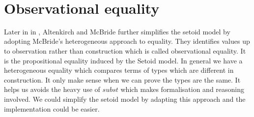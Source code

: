 \begin{code}
\\
\>[0]\<[2]%
\>[2] \AgdaSymbol{=}  \<[15]%
\>[15]\<%
\\
\>[2]\<[4]%
\>[4]\AgdaSymbol{\{}  \AgdaSymbol{=} \<%
\\
\>[2]\<[4]%
\>[4]\AgdaSymbol{;}  \AgdaSymbol{=} \AgdaFunction{[}  \AgdaFunction{]subst}\<%
\\
\>[2]\<[4]%
\>[4]\AgdaSymbol{;}  \AgdaSymbol{=}  \AgdaSymbol{\{}\AgdaSymbol{\}} \AgdaSymbol{\{}\AgdaSymbol{\}}  \AgdaSymbol{\{}\AgdaSymbol{\}} \AgdaSymbol{\{}\AgdaSymbol{\}}       \<%
\\
\>[2]\<[4]%
\>[4]\AgdaSymbol{;}  \AgdaSymbol{=}           \AgdaSymbol{\_} \AgdaSymbol{\_} \AgdaSymbol{(}\AgdaFunction{[}  \AgdaFunction{]refl*} \AgdaSymbol{\_} \AgdaSymbol{\_)}\<%
\\
\>[2]\<[4]%
\>[4]\AgdaSymbol{;}  \AgdaSymbol{=}          \AgdaSymbol{\_} \AgdaSymbol{\_} \AgdaSymbol{(}\AgdaFunction{[}  \AgdaFunction{]trans*} \AgdaSymbol{\_)}\<%
\\
\>[2]\<[4]%
\>[4]\AgdaSymbol{\}}\<%
\\
\end{code}



\section{Observational equality}


Later in in \cite{alti:ott-conf}, Altenkirch and McBride further
simplifies the setoid model by adopting McBride's heterogeneous
approach to equality. They identifies values up to observation rather than
  construction which is called observational equality. It is the
  propositional equality induced by the Setoid model.  In general we have a heterogeneous equality which
  compares terms of types which are different in construction. It only
  make sense when we can prove the types are the same. It helps us
  avoids the heavy use of $subst$ which makes formalisation and
  reasoning involved. We could simplify the setoid model by adapting this
  approach and the implementation could be easier.











